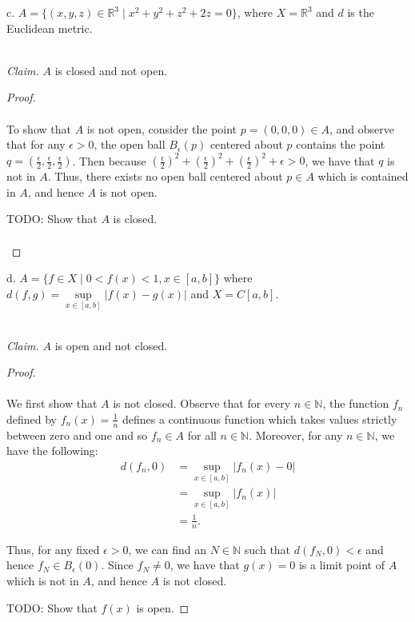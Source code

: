 \pagebreak

c.  $A = \{(x, y, z) \in \mathbb{R}^3 \mid x^2 + y^2 + z^2 + 2z = 0 \}$, where $X = \mathbb{R}^3$ and $d$ is the 
    Euclidean metric.

\ \\
\emph{Claim.} $A$ is closed and not open.

\begin{proof}\renewcommand{\qedsymbol}{}\ \\\\
    To show that $A$ is not open, consider the point $p = (0, 0, 0) \in A$, and observe that for any $\epsilon > 0$, the 
    open ball $B_\epsilon(p)$ centered about $p$ contains the point 
    $q = \left( \frac{\epsilon}{2}, \frac{\epsilon}{2}, \frac{\epsilon}{2} \right)$. Then because 
    $(\frac{\epsilon}{2})^2 + (\frac{\epsilon}{2})^2 + (\frac{\epsilon}{2})^2 + \epsilon > 0$, we have that $q$
    is not in $A$. Thus, there exists no open ball centered about $p \in A$ which is contained in $A$, and hence $A$ is
    not open.

    TODO: Show that $A$ is closed.

    \begin{align*}
    \end{align*}
\end{proof}

\pagebreak

d.  $A = \{ f \in X \mid 0 < f(x) < 1, x \in [a, b] \}$ where $d(f, g) = \sup\limits_{x \in [a, b]}{|f(x) - g(x)|}$ and 
    $X = C[a, b]$.

\ \\
\emph{Claim.} $A$ is open and not closed. 

\begin{proof}\renewcommand{\qedsymbol}{}\ \\\\
    We first show that $A$ is not closed. Observe that for every $n \in \mathbb{N}$, the function $f_n$ defined by 
    $f_n(x) = \frac{1}{n}$ defines a continuous function which takes values strictly between zero and one and so 
    $f_n \in A$ for all $n \in \mathbb{N}$. Moreover, for any $n \in \mathbb{N}$, we have the following:
    \begin{align*}
         d(f_n, 0) &= \sup\limits_{x \in [a, b]}{|f_n(x) - 0|} \\ 
                   &= \sup\limits_{x \in [a, b]}{|f_n(x)|} \\ 
                   &= \frac{1}{n}.
    \end{align*}

    Thus, for any fixed $\epsilon > 0$, we can find an $N \in \mathbb{N}$ such that $d(f_N, 0) < \epsilon$ and hence
    $f_N \in B_\epsilon(0)$. Since $f_N \neq 0$, we have that $g(x) = 0$ is a limit point of $A$ which is not in $A$, 
    and hence $A$ is not closed.

    TODO: Show that $f(x)$ is open.
\end{proof}

